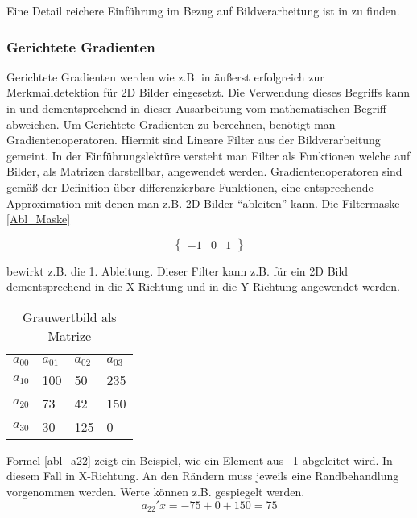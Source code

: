 Eine Detail reichere Einführung im Bezug auf Bildverarbeitung ist in \cite{Priese15} zu finden.

\subsubsection{Gerichtete Gradienten}
Gerichtete Gradienten werden wie z.B. in \cite{dalal2005histograms} äußerst erfolgreich zur Merkmaildetektion für 2D Bilder eingesetzt. Die Verwendung dieses Begriffs kann in \cite{scherer2010histograms} und dementsprechend in dieser Ausarbeitung vom mathematischen Begriff abweichen.
\newline
Um Gerichtete Gradienten zu berechnen, benötigt man Gradientenoperatoren. Hiermit sind Lineare Filter aus der Bildverarbeitung gemeint. In der Einführungslektüre \cite{Priese15} versteht man Filter als Funktionen welche auf Bilder, als Matrizen darstellbar, angewendet werden. Gradientenoperatoren sind gemäß der Definition über differenzierbare Funktionen, eine entsprechende Approximation mit denen man z.B. 2D Bilder "`ableiten"' kann. Die Filtermaske \ref{Abl_Maske} 

\begin{equation}
\label{Abl_Maske}
\begin{Bmatrix}
-1 & 0 & 1
\end{Bmatrix}
\end{equation}

bewirkt z.B. die 1. Ableitung. Dieser Filter kann z.B. für ein 2D Bild dementsprechend in die X-Richtung und in die Y-Richtung angewendet werden. 

\begin{table}[]
	\centering
	\caption{Grauwertbild als Matrize}
	\label{GrauwertMat}
	\begin{tabular}{llll}
		$a_{00}$ & $a_{01}$ & $a_{02}$ & $a_{03}$ \\
		$a_{10}$ & 100    & 50     & 235     \\
		$a_{20}$ & 73     & 42     & 150      \\
		$a_{30}$ & 30     & 125    & 0                     
	\end{tabular}
\end{table}

Formel \ref{abl_a22} zeigt ein Beispiel, wie ein Element aus \tablename~\ref{GrauwertMat} abgeleitet wird. In diesem Fall in X-Richtung. An den Rändern muss jeweils eine Randbehandlung vorgenommen werden. Werte können z.B. gespiegelt werden.
\begin{equation}
\label{abl_a22}
a_{22}'x = -75 + 0 +150 = 75
\end{equation}

